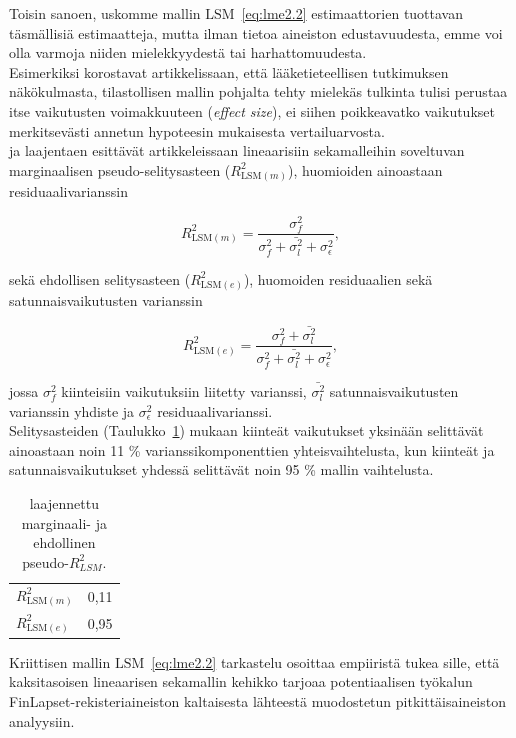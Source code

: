 \documentclass[finnish]{docopts}
\begin{document}
Toisin sanoen, uskomme mallin $\text{LSM}$~\ref{eq:lme2.2} estimaattorien tuottavan täsmällisiä estimaatteja, mutta ilman tietoa aineiston edustavuudesta, emme voi olla varmoja niiden mielekkyydestä tai harhattomuudesta.\\

Esimerkiksi \cite{sullivan12} korostavat artikkelissaan, että lääketieteellisen tutkimuksen näkökulmasta, tilastollisen mallin pohjalta tehty mielekäs tulkinta tulisi perustaa itse vaikutusten voimakkuuteen (\textit{effect size}), ei siihen poikkeavatko vaikutukset merkitsevästi annetun hypoteesin mukaisesta vertailuarvosta.\\

\cite{nakagawa13} ja laajentaen \cite{johnson14} esittävät artikkeleissaan lineaarisiin sekamalleihin soveltuvan marginaalisen pseudo-selitysasteen ($R^2_{\text{LSM}(m)}$), huomioiden ainoastaan residuaalivarianssin 

$$
R^2_{\text{LSM}(m)} = \frac{\sigma^2_{f}}{\sigma^2_{f} + \bar{\sigma^2_{l}} + \sigma^2_{\epsilon}},
$$

sekä ehdollisen selitysasteen ($R^2_{\text{LSM}(e)}$), huomoiden residuaalien sekä satunnaisvaikutusten varianssin

$$
R^2_{\text{LSM}(e)} = \frac{\sigma^2_{f} + \bar{\sigma^2_{l}}}{\sigma^2_{f} +  \bar{\sigma^2_{l}} + \sigma^2_{\epsilon}},
$$

jossa $\sigma^2_{f}$ kiinteisiin vaikutuksiin liitetty varianssi, $\bar{\sigma^2_{l}}$ satunnaisvaikutusten varianssin yhdiste ja  $\sigma^2_{\epsilon}$ residuaalivarianssi.\\

Selitysasteiden (Taulukko~\ref{table:r2}) mukaan kiinteät vaikutukset yksinään selittävät ainoastaan noin 11 \% varianssikomponenttien yhteisvaihtelusta, kun kiinteät ja satunnaisvaikutukset yhdessä selittävät noin 95 \% mallin vaihtelusta.\\

\begin{table}[H]
\centering
\begin{tabular}{lr}
\toprule
$R^2_{\text{LSM}(m)}$ & 0,11\\
$R^2_{\text{LSM}(e)}$ & 0,95\\
\bottomrule
\end{tabular}
\caption{\cite{johnson14} laajennettu marginaali- ja ehdollinen  pseudo-$R^2_{LSM}$.}
\label{table:r2}
\end{table}

Kriittisen mallin $\text{LSM}$~\ref{eq:lme2.2} tarkastelu osoittaa empiiristä tukea sille, että \cite{laird82} kaksitasoisen lineaarisen sekamallin kehikko tarjoaa potentiaalisen työkalun FinLapset-rekisteriaineiston kaltaisesta lähteestä muodostetun pitkittäisaineiston analyysiin.\\
\end{document}
